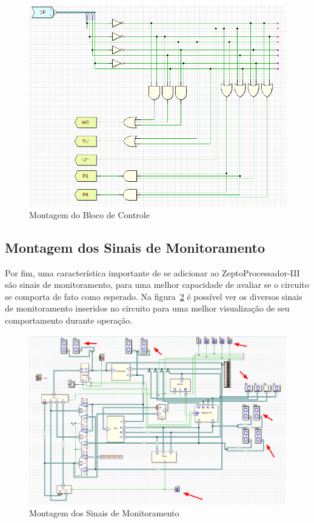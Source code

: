 \documentclass[12pt]{article}
\begin{document}
\begin{figure}[H]
    \centering
    \includegraphics[width=.9\textwidth]{Projeto/images/circuit__control.png}
    \caption{Montagem do Bloco de Controle}\label{fig:circuit__control.png}
\end{figure}

\subsection{Montagem dos Sinais de Monitoramento}\label{sec:2.4}

Por fim, uma característica importante de se adicionar ao ZeptoProcessador-III
são sinais de monitoramento, para uma melhor capacidade de avaliar se o circuito
se comporta de fato como esperado. Na figura~\ref{fig:circuit__signals.png} é
possível ver os diversos sinais de monitoramento inseridos no circuito para uma
melhor visualização de seu comportamento durante operação.

\begin{figure}[H]
    \centering
    \includegraphics[width=.9\textwidth]{Projeto/images/circuit__signals.png}
    \caption{Montagem dos Sinais de Monitoramento}\label{fig:circuit__signals.png}
\end{figure}
\end{document}
